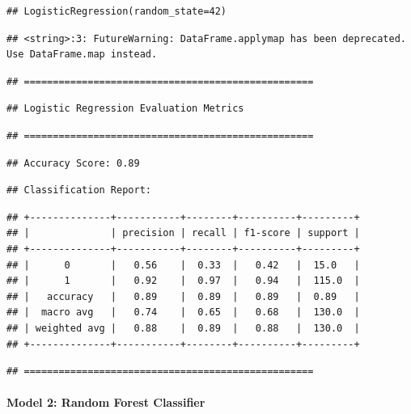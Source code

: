 \documentclass[preprint, 3p,
authoryear]{elsarticle} %
\begin{document}
\begin{verbatim}
## LogisticRegression(random_state=42)
\end{verbatim}

\begin{verbatim}
## <string>:3: FutureWarning: DataFrame.applymap has been deprecated. Use DataFrame.map instead.
\end{verbatim}

\begin{verbatim}
## ==================================================
\end{verbatim}

\begin{verbatim}
## Logistic Regression Evaluation Metrics
\end{verbatim}

\begin{verbatim}
## ==================================================
\end{verbatim}

\begin{verbatim}
## Accuracy Score: 0.89
\end{verbatim}

\begin{verbatim}
## Classification Report:
\end{verbatim}

\begin{verbatim}
## +--------------+-----------+--------+----------+---------+
## |              | precision | recall | f1-score | support |
## +--------------+-----------+--------+----------+---------+
## |      0       |   0.56    |  0.33  |   0.42   |  15.0   |
## |      1       |   0.92    |  0.97  |   0.94   |  115.0  |
## |   accuracy   |   0.89    |  0.89  |   0.89   |  0.89   |
## |  macro avg   |   0.74    |  0.65  |   0.68   |  130.0  |
## | weighted avg |   0.88    |  0.89  |   0.88   |  130.0  |
## +--------------+-----------+--------+----------+---------+
\end{verbatim}

\begin{verbatim}
## ==================================================
\end{verbatim}

\paragraph{Model 2: Random Forest
Classifier}\label{model-2-random-forest-classifier}
\end{document}
